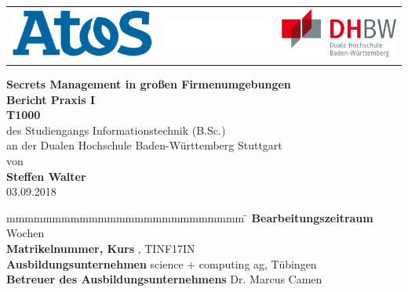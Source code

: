 \documentclass[
book,
a4paper,   
titlepage,  
halfparskip,
12pt        
]{scrartcl}
\begin{document}

\begin{titlepage}
\begin{longtable}{lcr}
{\includegraphics[height=1.7cm]{logo}} &
{\includegraphics[height=1.05cm]{blank}} &
{\includegraphics[height=1.7cm]{dhbw}}
\end{longtable}
\bigskip
\bigskip
\begin{center}
\vspace*{12mm} {\LARGE\bf Secrets Management in großen Firmenumgebungen}\\
\vspace*{12mm} {\large\bf Bericht Praxis I}\\
\vspace*{3mm} {\large\bf T1000}\\
\vspace*{12mm} des Studiengangs Informationstechnik (B.Sc.)\\ an der Dualen Hochschule Baden-Württemberg Stuttgart\\
\vspace*{12mm} von\\
\vspace*{3mm} {\large\bf Steffen Walter}\\
\vspace*{12mm} 03.09.2018\\
\end{center}
\vfill
\begin{spacing}{1.5}
\begin{tabbing}
mmmmmmmmmmmmmmmmmmmmmmmmmm \= \kill
\textbf{Bearbeitungszeitraum}  Wochen\\
\textbf{Matrikelnummer, Kurs} , TINF17IN\\
\textbf{Ausbildungsunternehmen} \> science + computing ag, Tübingen\\
\textbf{Betreuer des Ausbildungsunternehmens} \>Dr. Marcus Camen\\
\end{tabbing}
\end{spacing}
\end{titlepage}
\end{document}

